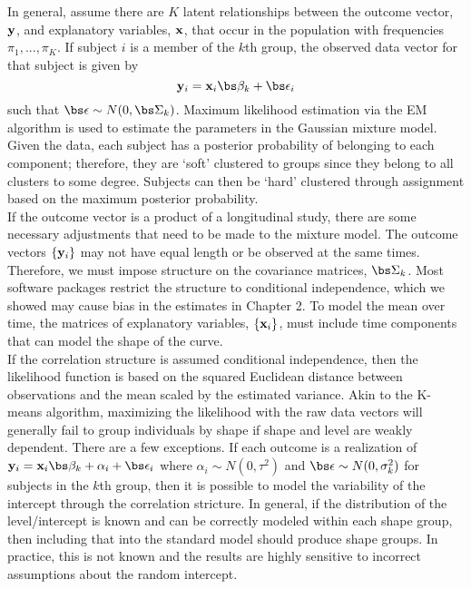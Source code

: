 In general, assume there are $K$ latent relationships between the outcome vector, $\mathbf y$, and explanatory variables, $\mathbf x$, that occur in the population with frequencies $\pi_{1},...,\pi_{K}$. If subject $i$ is a member of the $k$th group, the observed data vector for that subject is given by
$$\B y_{i} = \B x_{i}\bs\beta_{k}+\bs\epsilon_{i}$$
such that $\bs\epsilon \sim N(0,\bs\Sigma_{k})$. Maximum likelihood estimation via the EM algorithm is used to estimate the parameters in the Gaussian mixture model. Given the data, each subject has a posterior probability of belonging to each component; therefore, they are `soft' clustered to groups since they belong to all clusters to some degree. Subjects can then be `hard' clustered through assignment based on the maximum posterior probability. \\

If the outcome vector is a product of a longitudinal study, there are some necessary adjustments that need to be made to the mixture model. The outcome vectors $\{\mathbf y_{i}\}$ may not have equal length or be observed at the same times. Therefore, we must impose structure on the covariance matrices, $\bs\Sigma_{k}$. Most software packages restrict the structure to conditional independence, which we showed may cause bias in the estimates in Chapter 2. To model the mean over time, the matrices of explanatory variables, $\{\mathbf x_{i}\}$, must include time components that can model the shape of the curve. \\

If the correlation structure is assumed conditional independence, then the likelihood function is based on the squared Euclidean distance between observations and the mean scaled by the estimated variance. Akin to the K-means algorithm, maximizing the likelihood with the raw data vectors will generally fail to group individuals by shape if shape and level are weakly dependent. There are a few exceptions. If each outcome is a realization of $\B y_{i} = \B x_{i}\bs\beta_{k} + \alpha_{i}+\bs\epsilon_{i}$ where $\alpha_{i}\sim N(0,\tau^{2})$ and $\bs\epsilon\sim N(0,\sigma^{2}_{k})$ for subjects in the $k$th group, then it is possible to model the variability of the intercept through the correlation stricture. In general, if the distribution of the level/intercept is known and can be correctly modeled within each shape group, then including that into the standard model should produce shape groups. In practice, this is not known and the results are highly sensitive to incorrect assumptions about the random intercept.\\

